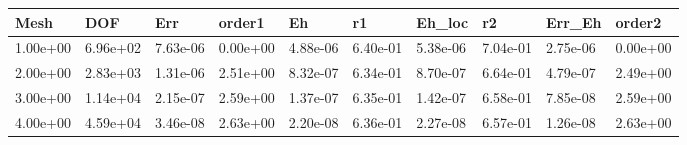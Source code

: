 \begin{tabular}{llllllllll}
Mesh & DOF & Err & order1 & Eh & r1 & Eh_loc & r2 & Err_Eh & order2 \\ 
\hline 
1.00e+00 & 6.96e+02 & 7.63e-06 & 0.00e+00 & 4.88e-06 & 6.40e-01 & 5.38e-06 & 7.04e-01 & 2.75e-06 & 0.00e+00 \\ 
2.00e+00 & 2.83e+03 & 1.31e-06 & 2.51e+00 & 8.32e-07 & 6.34e-01 & 8.70e-07 & 6.64e-01 & 4.79e-07 & 2.49e+00 \\ 
3.00e+00 & 1.14e+04 & 2.15e-07 & 2.59e+00 & 1.37e-07 & 6.35e-01 & 1.42e-07 & 6.58e-01 & 7.85e-08 & 2.59e+00 \\ 
4.00e+00 & 4.59e+04 & 3.46e-08 & 2.63e+00 & 2.20e-08 & 6.36e-01 & 2.27e-08 & 6.57e-01 & 1.26e-08 & 2.63e+00 \\ 
\hline 
\end{tabular}